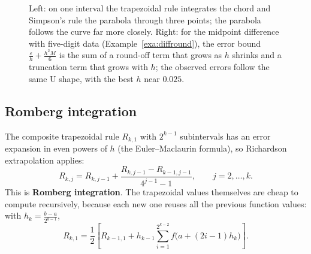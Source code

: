 \documentclass[11pt,a4paper]{article}
\numberwithin{equation}{section}
\theoremstyle{definition}
\begin{document}
\begin{figure}[H]
\caption{Left: on one interval the trapezoidal rule integrates the chord and Simpson's rule the parabola through three points; the parabola
follows the curve far more closely. Right: for the midpoint difference with five-digit data (Example~\ref{exa:diffround}), the error bound
$\frac\varepsilon h+\frac{h^2M}6$ is the sum of a round-off term that grows as $h$ shrinks and a truncation term that grows with $h$; the observed
errors follow the same U shape, with the best $h$ near $0.025$.}
\label{fig:quadrature}
\end{figure}


\subsection{Romberg integration}
\label{sec:romberg}

The composite trapezoidal rule $R_{k,1}$ with $2^{k-1}$ subintervals has an error expansion in even powers of $h$ (the Euler--Maclaurin
formula), so Richardson extrapolation applies:
$$R_{k,j} = R_{k,j-1}+\frac{R_{k,j-1}-R_{k-1,j-1}}{4^{j-1}-1},\qquad j = 2,\dots,k .$$
This is \textbf{Romberg integration}. The trapezoidal values themselves are cheap to compute recursively, because each new one reuses all the
previous function values: with $h_k = \frac{b-a}{2^{k-1}}$,
$$R_{k,1} = \frac12\left[R_{k-1,1}+h_{k-1}\sum_{i=1}^{2^{k-2}}f\bigl(a+(2i-1)h_k\bigr)\right] .$$
\end{document}
